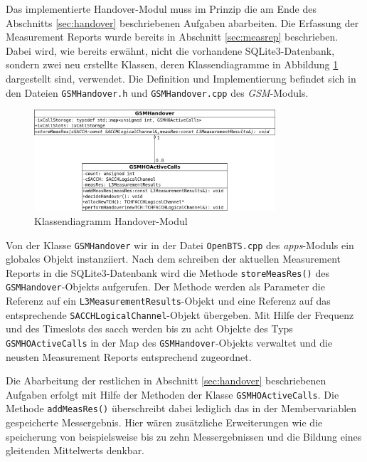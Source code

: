 \label{sec:hom}

Das implementierte Handover-Modul muss im Prinzip die am Ende des Abschnitts \ref{sec:handover} beschriebenen Aufgaben abarbeiten. Die Erfassung der Measurement Reports wurde bereits in Abschnitt \ref{sec:measrep} beschrieben. Dabei wird, wie bereits erwähnt, nicht die vorhandene SQLite3-Datenbank, sondern zwei neu erstellte Klassen, deren Klassendiagramme in Abbildung \ref{fig:homclass} dargestellt sind, verwendet. Die Definition und Implementierung befindet sich in den Dateien \lstinline{GSMHandover.h} und \lstinline{GSMHandover.cpp} des \textit{GSM}-Moduls.

\begin{figure}[h!t!b!p!]
  \centering
  \includegraphics[width=0.8\textwidth]{img/homc}
  \caption{Klassendiagramm Handover-Modul}
  \label{fig:homclass}
\end{figure}

Von der Klasse \lstinline{GSMHandover} wir in der Datei \lstinline{OpenBTS.cpp} des \textit{apps}-Moduls ein globales Objekt instanziiert. Nach dem schreiben der aktuellen Measurement Reports in die SQLite3-Datenbank wird die Methode \lstinline{storeMeasRes()} des \lstinline{GSMHandover}-Objekts aufgerufen. Der Methode werden als Parameter die Referenz auf ein \lstinline{L3MeasurementResults}-Objekt und eine Referenz auf das entsprechende \lstinline{SACCHLogicalChannel}-Objekt übergeben. Mit Hilfe der Frequenz und des Timeslots des \gls{sacch} werden bis zu acht Objekte des Typs \lstinline{GSMHOActiveCalls} in der Map des \lstinline{GSMHandover}-Objekts verwaltet und die neusten Measurement Reports entsprechend zugeordnet.

Die Abarbeitung der restlichen in Abschnitt \ref{sec:handover} beschriebenen Aufgaben erfolgt mit Hilfe der Methoden der Klasse \lstinline{GSMHOActiveCalls}. Die Methode \lstinline{addMeasRes()} überschreibt dabei lediglich das in der Membervariablen gespeicherte Messergebnis. Hier wären zusätzliche Erweiterungen wie die speicherung von beispielsweise bis zu zehn Messergebnissen und die Bildung eines gleitenden Mittelwerts denkbar.

